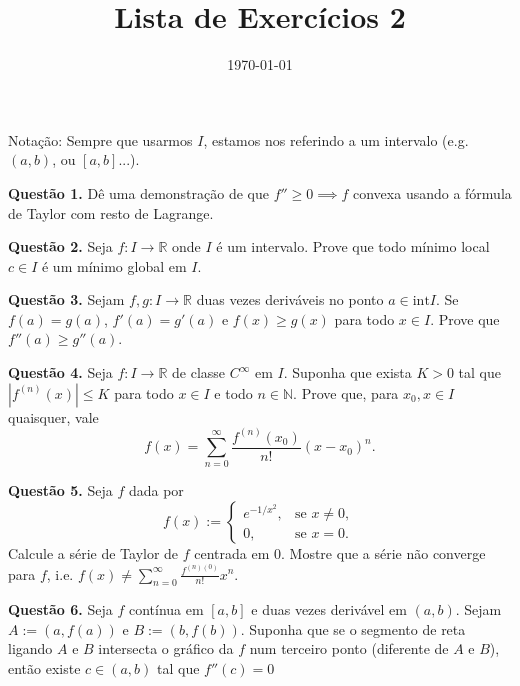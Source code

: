 \documentclass[10pt]{article}
\title{Lista de Exercícios 2}
\author{}
\date{\today}
\theoremstyle{definition}
\begin{document}
\maketitle

Notação: Sempre que usarmos $I$, estamos nos referindo a um intervalo (e.g. $(a,b)$, ou $[a,b]$...).

\noindent
\textbf{Questão 1.}
Dê uma demonstração de que $f'' \geq 0 \implies f$ convexa
usando a fórmula de Taylor com resto de Lagrange.
\vspace{5mm}

\noindent
\textbf{Questão 2.}
Seja $f:I\to \mathbb R$ onde $I$ é um intervalo. Prove que todo
mínimo local $c \in I$ é um mínimo global em $I$.
\vspace{5mm}

\noindent
\textbf{Questão 3.}
Sejam $f,g: I \to \mathbb R$ duas vezes deriváveis no ponto $a \in \text{int} I$.
Se $f(a)= g(a)$, $f'(a)=g'(a)$ e $f(x) \geq g(x)$ para todo $x \in I$.
Prove que $f''(a) \geq g''(a)$.
\vspace{5mm}

\noindent
\textbf{Questão 4.}
Seja $f:I\to \mathbb R$ de classe $C^\infty$ em $I$. Suponha que exista 
$K > 0$ tal que $|f^{(n)}(x)|\leq K$ para todo $x \in I$ e todo $n \in \mathbb N$.
Prove que, para $x_0,x \in I$ quaisquer, vale
\begin{equation*}
	f(x) = \sum^{\infty}_{n=0} \frac{f^{(n)}(x_0)}{n!}(x-x_0)^n.
\end{equation*}
\vspace{5mm}

\noindent
\textbf{Questão 5.}
Seja $f$ dada por
\begin{equation*}
	f(x):=
	\begin{cases}
		e^{-1/x^2}, & \text{se } x\neq 0,\\
		0, & \text{se } x=0.
	\end{cases}
\end{equation*}
Calcule a série de Taylor de $f$ centrada em $0$. Mostre que a série não converge para $f$, i.e.
$f(x) \neq \sum^\infty_{n=0} \frac{f^{(n)(0)}}{n!}x^n$.
\vspace{5mm}

\noindent
\textbf{Questão 6.}
Seja $f$ contínua em $[a,b]$ e duas vezes derivável em $(a,b)$. Sejam
$A:=(a,f(a))$ e $B:=(b,f(b))$. Suponha que se o segmento de reta ligando
$A$ e $B$ intersecta o gráfico da $f$ num terceiro ponto (diferente de $A$ e $B$),
então existe $c\in (a,b)$ tal que $f''(c)=0$
\vspace{5mm}
\end{document}
